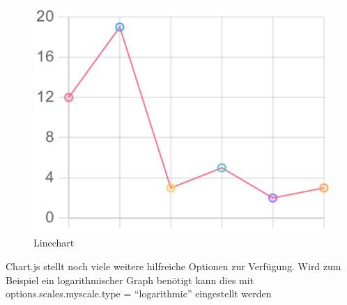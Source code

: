 \begin{figure}[H]
    \centering
    \includegraphics[scale=0.3]{pics/lineChart.png}
    \caption{Linechart}
    \label{fig:tech:linechart}
\end{figure}

Chart.js stellt noch viele weitere hilfreiche Optionen zur Verfügung. Wird
zum Beispiel ein logarithmischer Graph benötigt kann dies mit options.scales.myscale.type = ``logarithmic'' eingestellt werden

